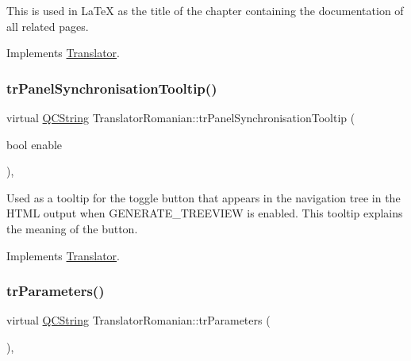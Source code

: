 This is used in La\+TeX as the title of the chapter containing the documentation of all related pages. 

Implements \mbox{\hyperlink{class_translator}{Translator}}.

\mbox{\label{class_translator_romanian_a723c470596dc1ddfae9b5d739921f534}} 
\subsubsection{\texorpdfstring{trPanelSynchronisationTooltip()}{trPanelSynchronisationTooltip()}}
{\footnotesize\ttfamily virtual \mbox{\hyperlink{class_q_c_string}{Q\+C\+String}} Translator\+Romanian\+::tr\+Panel\+Synchronisation\+Tooltip (\begin{DoxyParamCaption}\item[{bool}]{enable }\end{DoxyParamCaption})\hspace{0.3cm}{\ttfamily [inline]}, {\ttfamily [virtual]}}

Used as a tooltip for the toggle button that appears in the navigation tree in the H\+T\+ML output when G\+E\+N\+E\+R\+A\+T\+E\+\_\+\+T\+R\+E\+E\+V\+I\+EW is enabled. This tooltip explains the meaning of the button. 

Implements \mbox{\hyperlink{class_translator}{Translator}}.

\mbox{\label{class_translator_romanian_af8f41db10b615e04fe5728bea8befc97}} 
\subsubsection{\texorpdfstring{trParameters()}{trParameters()}}
{\footnotesize\ttfamily virtual \mbox{\hyperlink{class_q_c_string}{Q\+C\+String}} Translator\+Romanian\+::tr\+Parameters (\begin{DoxyParamCaption}{ }\end{DoxyParamCaption})\hspace{0.3cm}{\ttfamily [inline]}, {\ttfamily [virtual]}}

